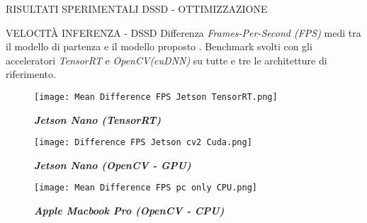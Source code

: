 \begin{subsection}{RISULTATI SPERIMENTALI DSSD - OTTIMIZZAZIONE}
    \begin{frame}{VELOCITÀ INFERENZA - DSSD}
        Differenza \emph{Frames-Per-Second (FPS)} medi tra il modello di partenza {} e il modello proposto {}. Benchmark svolti con gli acceleratori \emph{TensorRT} e \emph{OpenCV(cuDNN)} su tutte e tre le architetture di riferimento.\\
        \vspace{0.2cm}
        \begin{minipage}{\linewidth}
            \centering
            \begin{minipage}{0.45\linewidth}
                \begin{figure}
                    \centering
                    \texttt{[image: Mean Difference FPS Jetson TensorRT.png]}
                    \centering
                    \vspace{-0.5cm} 
                    \caption{{\bfseries{\emph{Jetson Nano (TensorRT)}}}}
                \end{figure}
            \end{minipage}
            \begin{minipage}{0.45\linewidth}
                \begin{figure}
                    \centering
                    \texttt{[image: Difference FPS Jetson cv2 Cuda.png]}
                    \centering
                    \vspace{-0.5cm} 
                    \caption{{\bfseries{\emph{Jetson Nano (OpenCV - GPU)}}}}
                \end{figure}
            \end{minipage}
        \end{minipage}
        \begin{minipage}{\linewidth}
            \centering
            \begin{minipage}{0.45\linewidth}
                \begin{figure}
                    \centering
                    \texttt{[image: Mean Difference FPS pc only CPU.png]}
                    \centering
                    \vspace{-0.5cm} 
                    \caption{{\bfseries{\emph{Apple Macbook Pro (OpenCV - CPU)}}}}
                \end{figure}

\end{minipage}
\end{minipage}
\end{frame}
\end{subsection}
